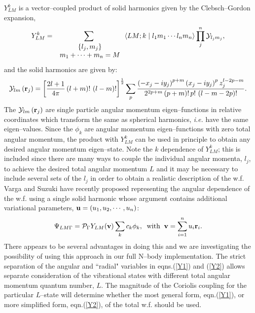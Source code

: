 $Y_{LM}^k$ is a vector--coupled product 
of solid harmonics\cite{Biedenharn81}
given by the Clebsch--Gordon expansion, 
\begin{equation}
Y_{LM}^k=\sum_{\,\,\begin{array}{c} {\left\{ l_j,m_j\right\} }
\\ {m_1+\cdots
+m_n=M} \end{array}
}\left\langle LM;k\right. |\left. l_1m_1\cdots l_nm_n\right\rangle
%
\prod_j^n{\cal Y}_{l_jm_j},
\end{equation}
and the solid harmonics are given by:
\begin{equation}
{\cal Y}_{lm}\left( {\bf r}_j\right) =\left[ \frac{2l+1}{4\pi }\left(
l+m\right) !\,\left( l-m\right) !\right] ^{\frac 12}\sum_p\frac{\left(
-x_j-iy_j\right) ^{p+m}\left( x_j-iy_j\right) ^pz_j^{l-2p-m}}{2^{2p+m}\left(
p+m\right) !\,p!\,\left( l-m-2p\right) !}.
\end{equation}
The ${\cal Y}_{lm}\left( {\bf r}_j\right) $ are single particle
angular momentum eigen--functions 
in relative coordinates which transform the
same as spherical harmonics, {\it i.e.} 
have the same eigen--values. Since
the $\phi _k$ are angular momentum 
eigen--functions with zero total angular
momentum, the product with $Y_{LM}^k$ 
can be used in principle to obtain any
desired angular momentum eigen--state. 
Note the $k$ dependence of $Y_{LM}^k$;
this is included since there are many 
ways to couple the individual angular
momenta, $l_j$, 
to achieve the desired total angular momentum $L$ and it may
be necessary to include several sets of the $l_j$ in order to obtain a
realistic description of the w.f. Varga and Suzuki\cite{Varga95}
have recently
proposed representing the angular dependence of the w.f. using
a single solid harmonic whose argument 
contains additional variational
parameters, ${\bf u} = (u_1, u_2, \cdots, u_n)$:
\begin{equation}
\Psi_{LM\Gamma } = {\cal P}_\Gamma Y_{LM}({\bf v}) \sum_k c_k \phi_k,
\; \; {\rm with} \; \; 
{\bf v} = \sum_{i=1}^{n} u_i {\bf r}_i.
\label{Y2}
\end{equation}
There appears to be several advantages in doing this and we are
investigating the possibility of using 
this approach in our full N--body
implementation.
The strict separation of the angular and ``radial" variables in
eqns.(\ref{Y1}) and (\ref{Y2}) allows separate consideration of
the vibrational states with different total angular momentum
quantum number, $L$. The magnitude of the Coriolis coupling
for the particular $L$--state will determine whether the most
general form, eqn.(\ref{Y1}), or more simplified form,
eqn.(\ref{Y2}), of the total w.f. should be used. 

